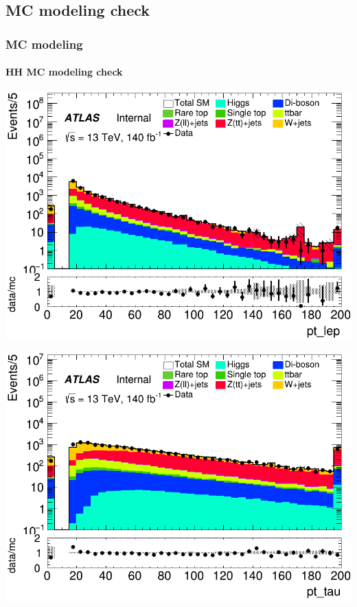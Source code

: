 \documentclass[usenames,dvipsnames]{beamer}
\begin{document}
\subsection{MC modeling check}
\begin{frame}
	\frametitle{MC modeling}
	\framesubtitle{HH MC modeling check}
    \begin{minipage}{0.32\textwidth}
        \centering
        \includegraphics[width=\textwidth]{graphics/HH_met/HH_met_pt_lep.png}
    \end{minipage}
    \hfill
    \begin{minipage}{0.32\textwidth}
        \centering
        \includegraphics[width=\textwidth]{graphics/HH_met/HH_met_pt_tau.png}
    \end{minipage}
    \hfill
    \begin{minipage}{0.32\textwidth}

\end{minipage}
\end{frame}
\end{document}
